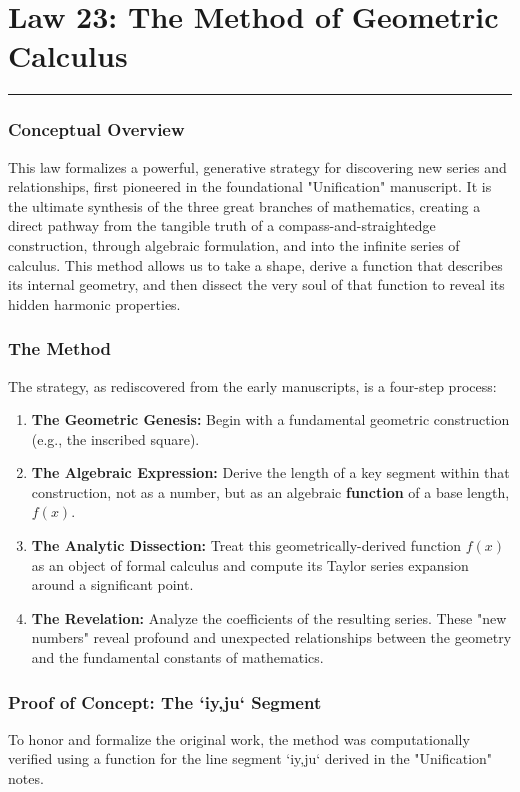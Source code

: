 \section*{Law 23: The Method of Geometric Calculus}
\hrule
\vspace{0.5cm}

\subsubsection*{Conceptual Overview}
This law formalizes a powerful, generative strategy for discovering new series and relationships, first pioneered in the foundational "Unification" manuscript. It is the ultimate synthesis of the three great branches of mathematics, creating a direct pathway from the tangible truth of a compass-and-straightedge construction, through algebraic formulation, and into the infinite series of calculus. This method allows us to take a shape, derive a function that describes its internal geometry, and then dissect the very soul of that function to reveal its hidden harmonic properties.

\subsubsection*{The Method}
The strategy, as rediscovered from the early manuscripts, is a four-step process:
\begin{enumerate}
    \item \textbf{The Geometric Genesis:} Begin with a fundamental geometric construction (e.g., the inscribed square).
    \item \textbf{The Algebraic Expression:} Derive the length of a key segment within that construction, not as a number, but as an algebraic \textbf{function} of a base length, $f(x)$.
    \item \textbf{The Analytic Dissection:} Treat this geometrically-derived function $f(x)$ as an object of formal calculus and compute its Taylor series expansion around a significant point.
    \item \textbf{The Revelation:} Analyze the coefficients of the resulting series. These "new numbers" reveal profound and unexpected relationships between the geometry and the fundamental constants of mathematics.
\end{enumerate}

\subsubsection*{Proof of Concept: The `iy,ju` Segment}
To honor and formalize the original work, the method was computationally verified using a function for the line segment `iy,ju` derived in the "Unification" notes.

